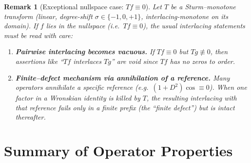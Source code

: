 \documentclass[11pt]{article}
\theoremstyle{breakdef}
\newtheorem{remark}[theorem]{Remark}
\begin{document}
\begin{remark}[Exceptional nullspace case: $Tf\equiv 0$]
Let $T$ be a Sturm--monotone transform (linear, degree-shift $\sigma\in\{-1,0,+1\}$, interlacing-monotone on its domain).
If $f$ lies in the nullspace  (i.e.\ $Tf\equiv 0$), the usual interlacing statements must be read with care:

\begin{enumerate}
\item \textbf{Pairwise interlacing becomes vacuous.}
If $Tf\equiv 0$ but $Tg\not\equiv 0$, then assertions like “$Tf$ interlaces $Tg$” are void since $Tf$ has no zeros to order.

\item \textbf{Finite--defect mechanism via annihilation of a reference.}
Many operators annihilate a specific reference (e.g.\ $(1{+}D^2)\cos\equiv 0$).  
When one factor in a Wronskian identity is killed by $T$, the resulting interlacing with that reference fails only in a finite prefix (the “finite defect”) but is intact thereafter.  
\end{enumerate}
\end{remark}


\section*{Summary of Operator Properties}
\end{document}
